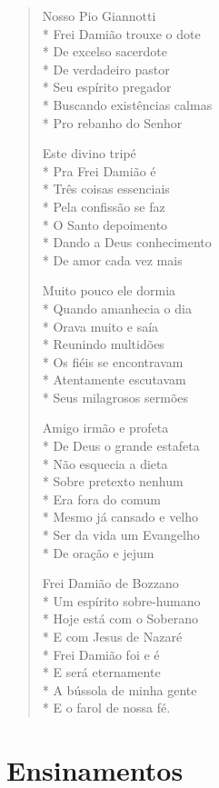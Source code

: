 \begin{verse}
Nosso Pio Giannotti\\*
Frei Damião trouxe o dote\\*
De excelso sacerdote\\*
De verdadeiro pastor\\*
Seu espírito pregador\\*
Buscando existências calmas\\*
Pro rebanho do Senhor

Este divino tripé\\*
Pra Frei Damião é\\*
Três coisas essenciais\\*
Pela confissão se faz\\*
O Santo depoimento\\*
Dando a Deus conhecimento\\*
De amor cada vez mais

Muito pouco ele dormia\\*
Quando amanhecia o dia\\*
Orava muito e saía\\*
Reunindo multidões\\*
Os fiéis se encontravam\\*
Atentamente escutavam\\*
Seus milagrosos sermões

Amigo irmão e profeta\\*
De Deus o grande estafeta\\*
Não esquecia a dieta\\*
Sobre pretexto nenhum\\*
Era fora do comum\\*
Mesmo já cansado e velho\\*
Ser da vida um Evangelho\\*
De oração e jejum

Frei Damião de Bozzano\\*
Um espírito sobre-humano\\*
Hoje está com o Soberano\\*
E com Jesus de Nazaré\\*
Frei Damião foi e é\\*
E será eternamente\\*
A bússola de minha gente\\*
E o farol de nossa fé.
\end{verse}


\chapter{Ensinamentos}

